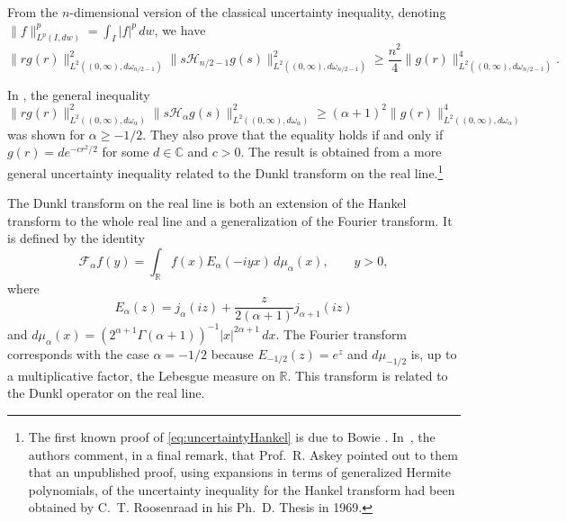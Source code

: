 \documentclass[a4paper]{amsart}
\theoremstyle{plain}
\theoremstyle{definition}
\begin{document}
From the $n$-dimensional version of the classical uncertainty inequality, denoting 
$\|f\|^p_{L^p(I,dw)} = \int_I |f|^p\,dw$, we have
\[
\|r g(r)\|_{L^2((0,\infty),d\omega_{n/2-1})}^2
\|s \mathcal{H}_{n/2-1}g(s)\|_{L^2((0,\infty),d\omega_{n/2-1})}^2
\ge \frac{n^2}{4}\|g(r)\|^4_{L^2((0,\infty),d\omega_{n/2-1})}.
\]

In \cite{Rosler-Voit2}, the general inequality
\begin{equation}
\label{eq:uncertaintyHankel}
\|r g(r)\|_{L^2((0,\infty),d\omega_\alpha)}^2
\|s \mathcal{H}_{\alpha}g(s)\|_{L^2((0,\infty),d\omega_\alpha)}^2
\ge (\alpha+1)^2\|g(r)\|^4_{L^2((0,\infty),d\omega_\alpha)}
\end{equation}
was shown for $\alpha\ge -1/2$. They also prove that the equality holds if and only if $g(r)=de^{-cr^2/2}$ for some $d\in \mathbb{C}$ and $c>0$. The result is obtained from a more general uncertainty inequality related to the Dunkl transform on the real line.\footnote{The first known proof of \eqref{eq:uncertaintyHankel} is due to Bowie \cite{Bowie}. In~\cite{Rosler-Voit2}, the authors comment, in a final remark, that Prof.\ R. Askey pointed out to them that an unpublished proof, using expansions in terms of generalized Hermite polynomials, of the uncertainty inequality for the Hankel transform had been obtained by C.~T. Roosenraad in his Ph.\ D. Thesis in 1969.}

The Dunkl transform on the real line is both an extension of the Hankel transform to the whole real line and a generalization of the Fourier transform. It is defined by the identity
\[
\mathcal{F}_\alpha f(y) = \int_{\mathbb{R}} f(x)E_{\alpha}(-i y x)\,d\mu_{\alpha}(x),\qquad y>0,
\]
where
\[
E_\alpha(z) = j_\alpha(iz)+\frac{z}{2(\alpha+1)}j_{\alpha+1}(iz)
\]
and $d\mu_{\alpha}(x) = (2^{\alpha+1}\Gamma(\alpha+1))^{-1}|x|^{2\alpha+1}\, dx$. The Fourier transform corresponds with the case $\alpha=-1/2$ because $E_{-1/2}(z)=e^{z}$ and $d\mu_{-1/2}$ is, up to a multiplicative factor, the Lebesgue measure on $\mathbb{R}$. This transform is related to the Dunkl operator on the real line.
\end{document}
